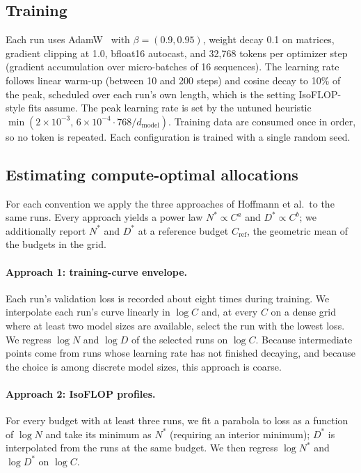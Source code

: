 \subsection{Training}
Each run uses AdamW~\citep{loshchilov2019adamw} with $\beta=(0.9, 0.95)$, weight decay 0.1 on matrices, gradient clipping at 1.0, bfloat16 autocast, and 32{,}768 tokens per optimizer step (gradient accumulation over micro-batches of 16 sequences). The learning rate follows linear warm-up (between 10 and 200 steps) and cosine decay to 10\% of the peak, scheduled over each run's own length, which is the setting IsoFLOP-style fits assume. The peak learning rate is set by the untuned heuristic $\min(2\times10^{-3},\,6\times10^{-4}\cdot 768/d_\text{model})$. Training data are consumed once in order, so no token is repeated. Each configuration is trained with a single random seed.

\subsection{Estimating compute-optimal allocations}
\label{sec:fits}
For each convention we apply the three approaches of Hoffmann et al.\ to the same runs. Every approach yields a power law $N^* \propto C^{a}$ and $D^* \propto C^{b}$; we additionally report $N^*$ and $D^*$ at a reference budget $C_\text{ref}$, the geometric mean of the budgets in the grid.

\paragraph{Approach 1: training-curve envelope.} Each run's validation loss is recorded about eight times during training. We interpolate each run's curve linearly in $\log C$ and, at every $C$ on a dense grid where at least two model sizes are available, select the run with the lowest loss. We regress $\log N$ and $\log D$ of the selected runs on $\log C$. Because intermediate points come from runs whose learning rate has not finished decaying, and because the choice is among discrete model sizes, this approach is coarse.

\paragraph{Approach 2: IsoFLOP profiles.} For every budget with at least three runs, we fit a parabola to loss as a function of $\log N$ and take its minimum as $N^*$ (requiring an interior minimum); $D^*$ is interpolated from the runs at the same budget. We then regress $\log N^*$ and $\log D^*$ on $\log C$.

